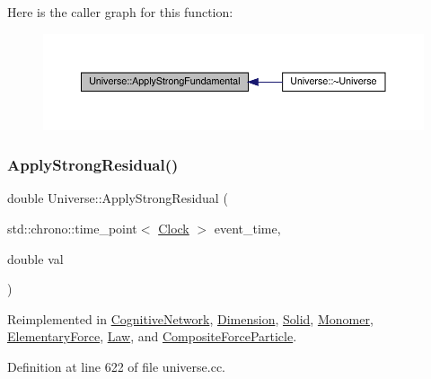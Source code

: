 Here is the caller graph for this function\+:
\nopagebreak
\begin{figure}[H]
\begin{center}
\leavevmode
\includegraphics[width=350pt]{class_universe_a62789bcff84bd750b0366004381e2fdd_icgraph}
\end{center}
\end{figure}
\mbox{\label{class_universe_af7becebb347be9a85541d96a3eca1ca7}} 
\subsubsection{\texorpdfstring{Apply\+Strong\+Residual()}{ApplyStrongResidual()}}
{\footnotesize\ttfamily double Universe\+::\+Apply\+Strong\+Residual (\begin{DoxyParamCaption}\item[{std\+::chrono\+::time\+\_\+point$<$ \hyperlink{universe_8h_a0ef8d951d1ca5ab3cfaf7ab4c7a6fd80}{Clock} $>$}]{event\+\_\+time,  }\item[{double}]{val }\end{DoxyParamCaption})\hspace{0.3cm}{\ttfamily [virtual]}}



Reimplemented in \hyperlink{class_cognitive_network_a8b60fdb81d89a3a74d6c06cb29e7aad3}{Cognitive\+Network}, \hyperlink{class_dimension_a2ae0b6a8ee17f6e28b6d2d3209df4bf4}{Dimension}, \hyperlink{class_solid_a07534fa79bb8a6eb32e081e5158ba9e5}{Solid}, \hyperlink{class_monomer_a921f7add2d446b8670513220ace6c4b2}{Monomer}, \hyperlink{class_elementary_force_a185dc4e0b840505df27dbbed9fdcdc7b}{Elementary\+Force}, \hyperlink{class_law_a266f86cdcc01e813249a2f192ab85eb3}{Law}, and \hyperlink{class_composite_force_particle_ae0937405e68dd40b19036d5a359f7e07}{Composite\+Force\+Particle}.



Definition at line 622 of file universe.\+cc.

